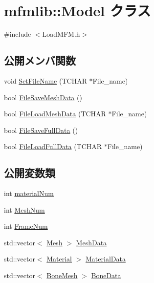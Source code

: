 \hypertarget{classmfmlib_1_1_model}{}\section{mfmlib\+:\+:Model クラス}
\label{classmfmlib_1_1_model}


{\ttfamily \#include $<$Load\+M\+F\+M.\+h$>$}

\subsection*{公開メンバ関数}
\begin{DoxyCompactItemize}
\item 
void \mbox{\hyperlink{classmfmlib_1_1_model_a56abf4bae21e85d159a306aaac20e851}{Set\+File\+Name}} (T\+C\+H\+AR $\ast$File\+\_\+name)
\item 
bool \mbox{\hyperlink{classmfmlib_1_1_model_a27950e34a457b62b0d6474cd8f7017aa}{File\+Save\+Mesh\+Data}} ()
\item 
bool \mbox{\hyperlink{classmfmlib_1_1_model_a906eb59ce0373f757c5473512e95c5a4}{File\+Load\+Mesh\+Data}} (T\+C\+H\+AR $\ast$File\+\_\+name)
\item 
bool \mbox{\hyperlink{classmfmlib_1_1_model_a78ed7288a1add6c6140b50f361102374}{File\+Save\+Full\+Data}} ()
\item 
bool \mbox{\hyperlink{classmfmlib_1_1_model_a0b260e285347695a8a9f0092b57ddb7f}{File\+Load\+Full\+Data}} (T\+C\+H\+AR $\ast$File\+\_\+name)
\end{DoxyCompactItemize}
\subsection*{公開変数類}
\begin{DoxyCompactItemize}
\item 
int \mbox{\hyperlink{classmfmlib_1_1_model_a0a25d19e204a8075af58d3cf84c9446e}{material\+Num}}
\item 
int \mbox{\hyperlink{classmfmlib_1_1_model_ab810627ca36c30ef29d787ca5b81d7ba}{Mesh\+Num}}
\item 
int \mbox{\hyperlink{classmfmlib_1_1_model_a3ad1641bef61a820154ac7e9d7806f52}{Frame\+Num}}
\item 
std\+::vector$<$ \mbox{\hyperlink{classmfmlib_1_1_mesh}{Mesh}} $>$ \mbox{\hyperlink{classmfmlib_1_1_model_a77fc5611ec675c619d1082d0f7a966d2}{Mesh\+Data}}
\item 
std\+::vector$<$ \mbox{\hyperlink{structmfmlib_1_1_material}{Material}} $>$ \mbox{\hyperlink{classmfmlib_1_1_model_ab9e64c1b2c11cdc0bf8844ee076d2f78}{Material\+Data}}
\item 
std\+::vector$<$ \mbox{\hyperlink{classmfmlib_1_1_bone_mesh}{Bone\+Mesh}} $>$ \mbox{\hyperlink{classmfmlib_1_1_model_a54babd8cc910d4f54935b75bcaf81023}{Bone\+Data}}
\end{DoxyCompactItemize}
